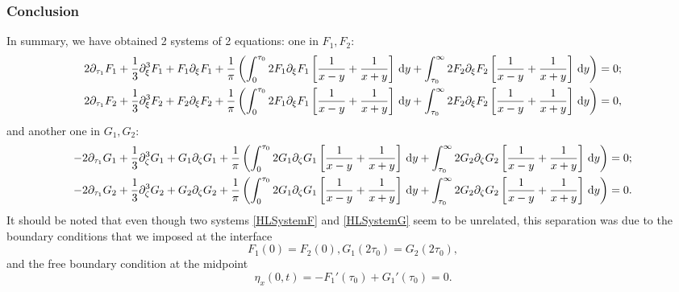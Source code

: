 \documentclass[10pt,reqno,oneside,a4paper, landscape]{article}
\begin{document}
\subsubsection*{Conclusion}
In summary, we have obtained 2 systems of 2 equations: one in $F_1, F_2:$
\begin{equation}\label{HLSystemF}
\begin{aligned}
2 \partial_{\tau_1}F_1 + \frac{1}{3} \partial_\xi^3 F_1 + F_1\partial_\xi F_1 + \frac{1}{\pi} \left( \int_0^{\tau_0} 2 F_1  \partial_\xi F_1 \left[ \frac{1}{x-y} + \frac{1}{x+y} \right] \,\mathrm{d} y +\int_{\tau_0}^\infty 2 F_2 \partial_\xi F_2\left[ \frac{1}{x-y} + \frac{1}{x+y} \right] \,\mathrm{d} y \right) &= 0; \\
2 \partial_{\tau_1}F_2 + \frac{1}{3} \partial_\xi^3 F_2 + F_2\partial_\xi F_2 + \frac{1}{\pi} \left( \int_0^{\tau_0} 2 F_1  \partial_\xi F_1 \left[ \frac{1}{x-y} + \frac{1}{x+y} \right] \,\mathrm{d} y +\int_{\tau_0}^\infty 2 F_2 \partial_\xi F_2\left[ \frac{1}{x-y} + \frac{1}{x+y} \right] \,\mathrm{d} y \right) &= 0,
\end{aligned}
\end{equation}
and another one in $G_1, G_2:$
\begin{equation}\label{HLSystemG}
\begin{aligned}
- 2 \partial_{\tau_1} G_1 +  \frac{1}{3} \partial_\zeta^3 G_1+ G_1 \partial_{\zeta} G_1  + \frac{1}{\pi} \left( \int_0^{\tau_0}  2 G_1 \partial_\zeta G_1 \left[ \frac{1}{x-y} + \frac{1}{x+y} \right] \,\mathrm{d} y +\int_{\tau_0}^\infty 2 G_2 \partial_\zeta G_2 \left[ \frac{1}{x-y} + \frac{1}{x+y} \right] \,\mathrm{d} y \right) &= 0; \\
- 2 \partial_{\tau_1} G_2 +  \frac{1}{3} \partial_\zeta^3 G_2+ G_2 \partial_{\zeta} G_2  + \frac{1}{\pi} \left( \int_0^{\tau_0}  2 G_1 \partial_\zeta G_1 \left[ \frac{1}{x-y} + \frac{1}{x+y} \right] \,\mathrm{d} y +\int_{\tau_0}^\infty 2 G_2 \partial_\zeta G_2 \left[ \frac{1}{x-y} + \frac{1}{x+y} \right] \,\mathrm{d} y \right) &= 0.
\end{aligned}
\end{equation}
It should be noted that even though two systems \eqref{HLSystemF} and \eqref{HLSystemG} seem to be unrelated, this separation was due to the boundary conditions that we imposed at the interface
\[ F_1(0) = F_2(0), G_1(2\tau_0) =G_2(2\tau_0), \]
and the free boundary condition at the midpoint
\[ \eta_x(0,t) = -F_1'(\tau_0)+ G_1'(\tau_0) = 0. \]
\end{document}
